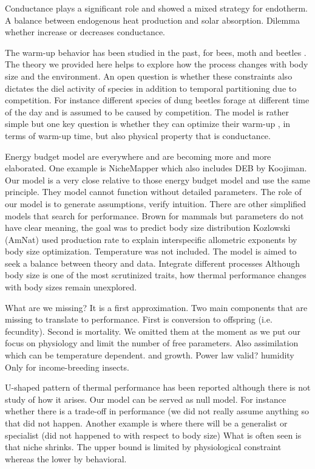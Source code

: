 Conductance plays a significant role and showed a mixed strategy for endotherm.
A balance between endogenous heat production and solar absorption. 
Dilemma whether increase or decreases conductance.

The warm-up behavior has been studied in the past, for bees, moth and beetles \citep{Kammer1974, Bartholomew1978, Bartholomew1981}.
The theory we provided here helps to explore how the process changes with body size and the environment.
An open question is whether these constraints also dictates the diel activity of species in addition to temporal partitioning due to competition. 
For instance different species of dung beetles forage at different time of the day \citep{Viljanen2010} and is assumed to be caused by competition.
The model is rather simple but one key question is whether they can optimize their warm-up , in terms of warm-up time, but also physical property that is conductance.

Energy budget model are everywhere and are becoming more and more elaborated.
One example is NicheMapper which also includes DEB by Koojiman.
Our model is a very close relative to those energy budget model and use the same principle.
They model cannot function without detailed parameters.
The role of our model is to generate assumptions, verify intuition.
 There are other simplified models that search for performance. 
Brown for mammals but parameters do not have clear meaning, the goal was to predict body size distribution 
Kozlowski (AmNat) used production rate to explain interspecific allometric exponents by body size optimization.
Temperature was not included.  
The model is aimed to seek a balance between theory and data.
Integrate different processes 
Although body size is one of the most scrutinized traits,  how thermal performance changes with body sizes remain unexplored.

What are we missing?
It is a first approximation. 
Two main components that are missing to translate to performance.
First is conversion to offspring (i.e. fecundity).
Second is mortality.
We omitted them at the moment as we put our focus on physiology and limit the number of free parameters.
Also assimilation which can be temperature dependent.
and growth.
Power law valid?
humidity
Only for income-breeding insects.
 
 U-shaped pattern of thermal performance has been reported although there is not study of how it arises.
 Our model can be served as null model.
 For instance whether there is a trade-off in performance (we did not really assume anything so that did not happen.
 Another example is where there will be a generalist or specialist (did not happened to with respect to body size)
 What is often seen is that niche shrinks.
 The upper bound is limited by physiological  constraint whereas the lower by behavioral.
  
